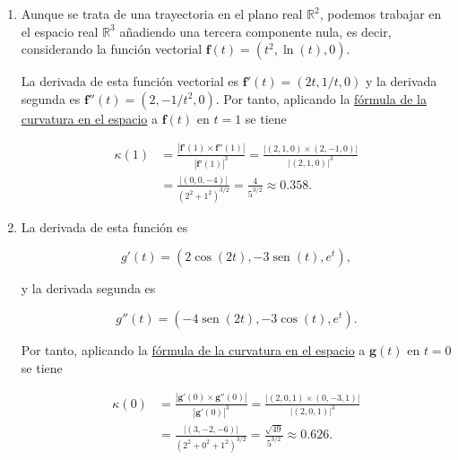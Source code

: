 \documentclass[
  a4paper,
]{scrreport}
\theoremstyle{definition}
\theoremstyle{remark}
\begin{document}
\begin{tcolorbox}[enhanced jigsaw, coltitle=black, toptitle=1mm, colframe=quarto-callout-tip-color-frame, colbacktitle=quarto-callout-tip-color!10!white, breakable, opacityback=0, bottomtitle=1mm, opacitybacktitle=0.6, title=\textcolor{quarto-callout-tip-color}{\faLightbulb}\hspace{0.5em}{Solución}, arc=.35mm, leftrule=.75mm, toprule=.15mm, titlerule=0mm, bottomrule=.15mm, left=2mm, rightrule=.15mm, colback=white]

\begin{enumerate}
\def\labelenumi{\alph{enumi}.}
\item
  Aunque se trata de una trayectoria en el plano real \(\mathbb{R}^2\),
  podemos trabajar en el espacio real \(\mathbb{R}^3\) añadiendo una
  tercera componente nula, es decir, considerando la función vectorial
  \(\mathbf{f}(t) = (t^2, \ln(t), 0)\).

  La derivada de esta función vectorial es
  \(\mathbf{f}'(t) = (2t, 1/t, 0)\) y la derivada segunda es
  \(\mathbf{f}''(t) = (2, -1/t^2, 0)\). Por tanto, aplicando la
  \href{https://aprendeconalf.es/analisis-manual/12-funciones-vectoriales.html\#thm-curvatura-trayectoria-espacio-real}{fórmula
  de la curvatura en el espacio} a \(\mathbf{f}(t)\) en \(t=1\) se tiene

  \begin{align*}
  \kappa(1) &= 
  \frac{|\mathbf{f}'(1)\times \mathbf{f}''(1)|}{|\mathbf{f}'(1)|^3}
  = \frac{|(2,1,0)\times (2,-1,0)|}{|(2,1,0)|^3} \\
  & = \frac{|(0,0,-4)|}{(2^2+1^2)^{3/2}} 
  = \frac{4}{5^{3/2}} 
  \approx 0.358.
  \end{align*}
\item
  La derivada de esta función es

  \[
  g'(t) = (2\cos(2t), -3\operatorname{sen}(t), e^t),
  \]

  y la derivada segunda es

  \[
  g''(t) = (-4\operatorname{sen}(2t), -3\cos(t), e^t).
  \]

  Por tanto, aplicando la
  \href{https://aprendeconalf.es/analisis-manual/12-funciones-vectoriales.html\#thm-curvatura-trayectoria-espacio-real}{fórmula
  de la curvatura en el espacio} a \(\mathbf{g}(t)\) en \(t=0\) se tiene

  \begin{align*}
  \kappa(0) 
  &= \frac{|\mathbf{g}'(0)\times \mathbf{g}''(0)|}{|\mathbf{g}'(0)|^3} 
  = \frac{|(2,0,1)\times (0,-3,1)|}{|(2,0,1)|^3} \\
  &= \frac{|(3,-2,-6)|}{(2^2+0^2+1^2)^{3/2}}
  = \frac{\sqrt{49}}{5^{3/2}}
  \approx 0.626.
  \end{align*}
\end{enumerate}

\end{tcolorbox}
\end{document}
